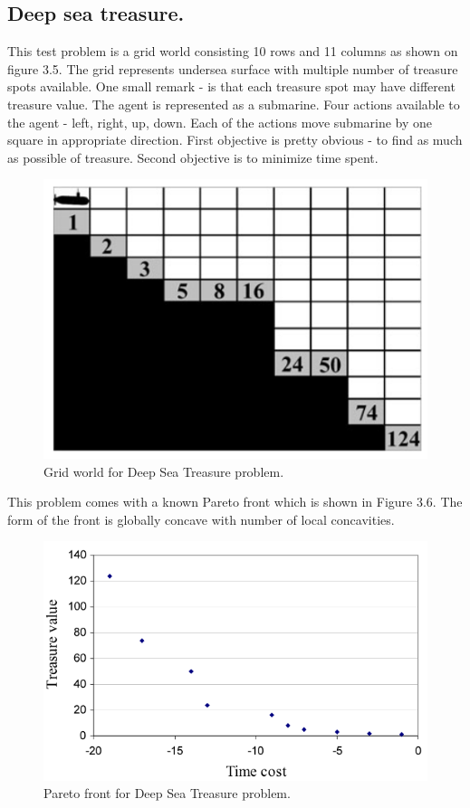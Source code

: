 \subsection{Deep sea treasure.}
This test problem is a grid world consisting 10 rows and 11 columns as shown on figure 3.5. The grid represents undersea surface with multiple number of treasure spots available. One small remark - is that each treasure spot may have different treasure value. The agent is represented as a submarine. Four actions available to the agent - left, right, up, down. Each of the actions move submarine by one square in appropriate direction. First objective is pretty obvious - to find as much as possible of treasure. Second objective is to minimize time spent. \\
\begin{figure}[ht]
\vskip 0.2in
\centering
\includegraphics[scale=0.9]{dst.png}
\caption{Grid world for Deep Sea Treasure problem.}
\label{ParetoDominance}
\end{figure}

This problem comes with a known Pareto front which is shown in Figure 3.6. The form of the front is globally concave with number of local concavities.
\begin{figure}[ht]
\vskip 0.2in
\centering
\includegraphics[scale=0.9]{dstPareto.png}
\caption{Pareto front for Deep Sea Treasure problem.}
\label{ParetoDominance}
\end{figure}

